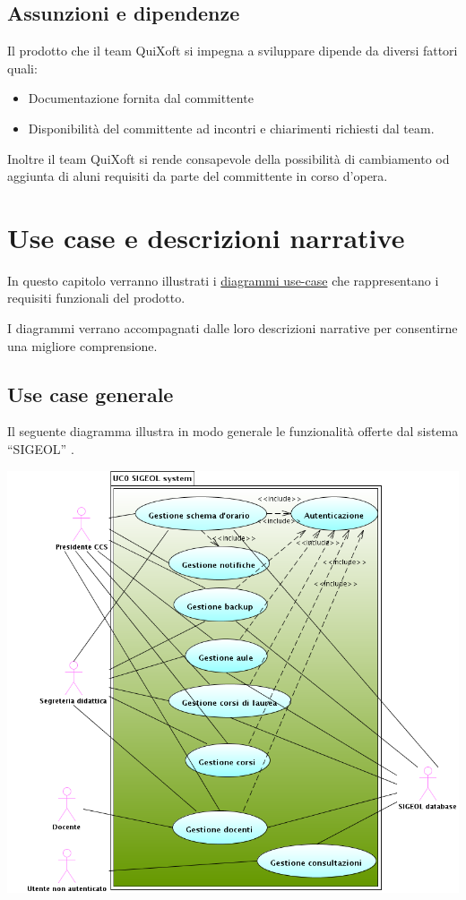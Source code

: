 \documentclass[11pt,a4paper]{article}
\begin{document}
\subsection{Assunzioni e dipendenze}
Il prodotto che il team QuiXoft si impegna a sviluppare dipende da diversi fattori quali:
\begin{itemize}
 \item Documentazione fornita dal committente
 \item Disponibilità del committente ad incontri e chiarimenti richiesti dal team.
\end{itemize}
Inoltre il team QuiXoft si rende consapevole della possibilità di cambiamento od aggiunta di aluni requisiti da parte del committente in corso d'opera.
\section{Use case e descrizioni narrative}
In questo capitolo verranno illustrati i \underline{diagrammi use-case} che rappresentano i requisiti funzionali del prodotto.

I diagrammi verrano accompagnati dalle loro descrizioni narrative per consentirne una migliore comprensione.
\subsection{Use case generale}
Il seguente diagramma illustra in modo generale le funzionalità offerte dal sistema ``SIGEOL'' .
\begin{center}
 \includegraphics[scale=0.5]{images/UseCaseSistema.png}
\end{center}
\end{document}
